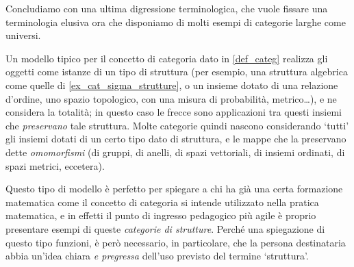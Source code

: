 Concludiamo con una ultima digressione terminologica, che vuole fissare una terminologia elusiva ora che disponiamo di molti esempi di categorie larghe come universi.
\begin{remark}\label{frecce_o_morfismi}
 Un modello tipico per il concetto di categoria dato in \ref{def_categ} realizza gli oggetti come istanze di un tipo di struttura (per esempio, una struttura algebrica come quelle di \ref{ex_cat_sigma_strutture}, o un insieme dotato di una relazione d'ordine, uno spazio topologico, con una misura di probabilità, metrico\dots), e ne considera la totalità; in questo caso le frecce sono applicazioni tra questi insiemi che \emph{preservano} tale struttura. Molte categorie quindi nascono considerando `tutti' gli insiemi dotati di un certo tipo dato di struttura, e le mappe che la preservano dette \emph{omomorfismi} (di gruppi, di anelli, di spazi vettoriali, di insiemi ordinati, di spazi metrici, eccetera).

 Questo tipo di modello è perfetto per spiegare a chi ha già una certa formazione matematica come il concetto di categoria si intende utilizzato nella pratica matematica, e in effetti il punto di ingresso pedagogico più agile è proprio presentare esempi di queste \emph{categorie di strutture}. Perché una spiegazione di questo tipo funzioni, è però necessario, in particolare, che la persona destinataria abbia un'idea chiara \emph{e pregressa} dell'uso previsto del termine `struttura'.


\end{remark}
